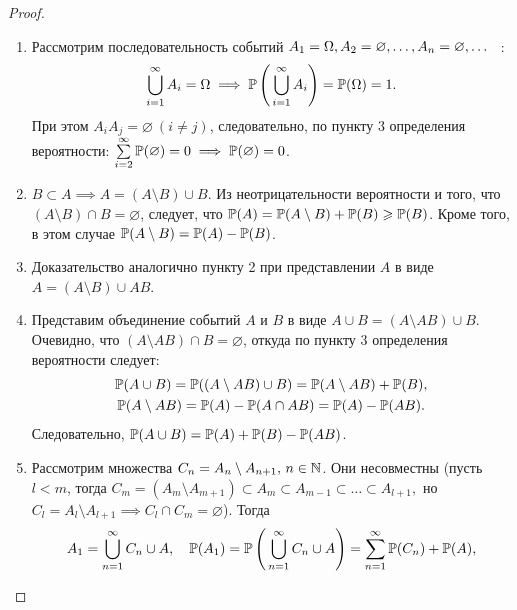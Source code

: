 \begin{proof}\leavevmode
	\begin{enumerate}
		\item 
		      Рассмотрим последовательность событий $A_{1} = \Omega, A_{2} = \varnothing, \ldots, \\ 
		      A_{n} = \varnothing, \ldots$ \, :
		      \begin{equation*}
		      	\bigcup\limits_{i=1}^\infty A_i = \Omega \implies \operatorname{\mathbb{P}} \left(\, \bigcup\limits_{i=1}^\infty A_i \right) = \operatorname{\mathbb{P}}(\Omega) = 1.
		      \end{equation*}
		      При этом $A_{i}A_j = \varnothing~(i \ne j)$, следовательно, по пункту 3 определения вероятности: $\sum\limits_{i=2}^\infty \operatorname{\mathbb{P}}(\varnothing) = 0 \implies \operatorname{\mathbb{P}}(\varnothing) = 0$.
		\item 
		      $B \subset A \implies A = (A \setminus B) \cup B$. 
		      Из неотрицательности вероятности и того, что $(A \setminus B) \cap B = \varnothing$, следует, что $\operatorname{\mathbb{P}}(A) = \operatorname{\mathbb{P}}(A \setminus B) + \operatorname{\mathbb{P}}(B) \geqslant \operatorname{\mathbb{P}}(B)$. 
		      Кроме того, в этом случае $\operatorname{\mathbb{P}}(A \setminus B) = \operatorname{\mathbb{P}}(A) - \operatorname{\mathbb{P}}(B)$.
		\item 
		      Доказательство аналогично пункту 2 при представлении $A$ в виде \\
		      $A = (A \setminus B) \cup AB$.
		\item 
		      Представим объединение событий $A$ и $B$ в виде $A \cup B = (A \setminus AB) \cup B$. 
		      Очевидно, что $(A \setminus AB) \cap B = \varnothing$, откуда по пункту 3 определения вероятности следует:
		      \begin{gather*}
		      	\operatorname{\mathbb{P}}(A \cup B) = \operatorname{\mathbb{P}}((A \setminus AB) \cup B) = \operatorname{\mathbb{P}}(A \setminus AB) + \operatorname{\mathbb{P}}(B), \\
		      	\operatorname{\mathbb{P}}(A \setminus AB) = \operatorname{\mathbb{P}}(A) - \operatorname{\mathbb{P}}(A \cap AB) = \operatorname{\mathbb{P}}(A) - \operatorname{\mathbb{P}}(AB).
		      \end{gather*}
		      Следовательно, $\operatorname{\mathbb{P}}(A \cup B) = \operatorname{\mathbb{P}}(A) + \operatorname{\mathbb{P}}(B) - \operatorname{\mathbb{P}}(AB)$.
		\item 
		      Рассмотрим множества $C_n = A_n \setminus A_{n+1}, \, n \in \mathbb{N}$. 
		      Они несовместны (пусть $l < m$, тогда $C_m = (A_m \setminus A_{m+1}) \subset A_m \subset A_{m-1} \subset \ldots \subset A_{l+1},$ но $C_l = A_l \setminus A_{l+1} \implies C_l \cap C_m = \varnothing$). 
		      Тогда
		      \begin{gather*}
		      	A_1 = \bigcup\limits_{n = 1}^{\infty} C_n \cup A, \quad \MyPr(A_1) = \MyPr\left(\, \bigcup\limits_{n = 1}^{\infty} C_n \cup A \right) = \sum\limits_{n=1}^{\infty} \MyPr(C_n) + \MyPr(A), \\

\end{gather*}
\end{enumerate}
\end{proof}
